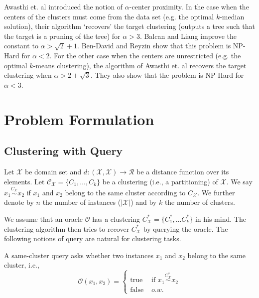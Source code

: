 \documentclass[orivec]{llncs}
\newcommand{\mc}{\mathcal}
\begin{document}
Awasthi et. al \cite{awasthi2012center} introduced the notion of $\alpha$-center proximity. In the case when the centers of the clusters must come from the data set (e.g. the optimal $k$-median solution), their algorithm `recovers' the target clustering (outputs a tree such that the target is a pruning of the tree) for $\alpha > 3$.  Balcan and Liang \cite{balcan2012clustering} improve the constant to $\alpha > \sqrt{2} + 1$. Ben-David and Reyzin \cite{ben2014data} show that this problem is NP-Hard for $\alpha < 2$. For the other case when the centers are unrestricted (e.g. the optimal $k$-means clustering), the algorithm of Awasthi et. al \cite{awasthi2012center} recovers the target clustering when $\alpha > 2+\sqrt{3}$. They also show that the problem is NP-Hard for $\alpha < 3$.

\section{Problem Formulation}



\subsection{Clustering with Query}

Let $\mc X$ be domain set and $d:(\mc X, \mc X) \rightarrow \mc R $ be a distance function over its elements. Let $\mc C_{\mc X} = \{C_1, \ldots, C_k\}$ be a clustering (i.e., a partitioning) of $\mc X$. We say $x_1 \overset{C_{\mc X}}{\sim} x_2$ if $x_1$ and $x_2$ belong to the same cluster according to $C_{\mc X}$. We further denote by $n$ the number of instances ($|{\mc X}|$) and by $k$ the number of clusters.

We assume that an oracle $\mc O$ has a clustering $C^*_{\mc X}=\{ C^*_1, \ldots C^*_k\}$ in his mind. The clustering algorithm then tries to recover $C^*_{\mc X}$ by querying the oracle. The following notions of query are natural for clustering tasks.

\begin{definition}
A same-cluster query asks whether two instances $x_1$ and $x_2$ belong to the same cluster, i.e., 
$${\mc O}(x_1, x_2) = \left\{
	\begin{array}{ll}
		\mbox{true }  & \mbox{if } x_1 \overset{C^*_{\mc X}}{\sim} x_2   \\
		\mbox{false } & o.w. 
	\end{array}
\right. $$
\end{definition}
\end{document}
